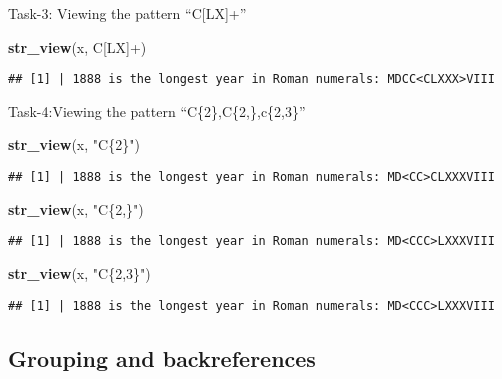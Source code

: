 \documentclass[
]{article}
\newenvironment{Shaded}{\begin{snugshade}}{\end{snugshade}}
\newcommand{\FunctionTok}[1]{\textcolor[rgb]{0.13,0.29,0.53}{\textbf{#1}}}
\newcommand{\NormalTok}[1]{#1}
\newcommand{\StringTok}[1]{\textcolor[rgb]{0.31,0.60,0.02}{#1}}
\begin{document}
Task-3: Viewing the pattern ``C{[}LX{]}+''

\begin{Shaded}
\begin{Highlighting}[]
\FunctionTok{str\_view}\NormalTok{(x, }\StringTok{\textquotesingle{}C[LX]+\textquotesingle{}}\NormalTok{)}
\end{Highlighting}
\end{Shaded}

\begin{verbatim}
## [1] | 1888 is the longest year in Roman numerals: MDCC<CLXXX>VIII
\end{verbatim}

Task-4:Viewing the pattern ``C\{2\},C\{2,\},c\{2,3\}''

\begin{Shaded}
\begin{Highlighting}[]
\FunctionTok{str\_view}\NormalTok{(x, }\StringTok{"C\{2\}"}\NormalTok{)}
\end{Highlighting}
\end{Shaded}

\begin{verbatim}
## [1] | 1888 is the longest year in Roman numerals: MD<CC>CLXXXVIII
\end{verbatim}

\begin{Shaded}
\begin{Highlighting}[]
\FunctionTok{str\_view}\NormalTok{(x, }\StringTok{"C\{2,\}"}\NormalTok{)}
\end{Highlighting}
\end{Shaded}

\begin{verbatim}
## [1] | 1888 is the longest year in Roman numerals: MD<CCC>LXXXVIII
\end{verbatim}

\begin{Shaded}
\begin{Highlighting}[]
\FunctionTok{str\_view}\NormalTok{(x, }\StringTok{"C\{2,3\}"}\NormalTok{)}
\end{Highlighting}
\end{Shaded}

\begin{verbatim}
## [1] | 1888 is the longest year in Roman numerals: MD<CCC>LXXXVIII
\end{verbatim}

\hypertarget{grouping-and-backreferences}{%
\subsection{Grouping and
backreferences}\label{grouping-and-backreferences}}
\end{document}
